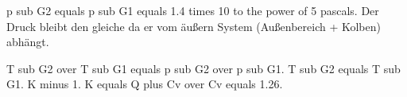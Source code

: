 p sub G2 equals p sub G1 equals 1.4 times 10 to the power of 5 pascals. Der Druck bleibt den gleiche da er vom äußern System (Außenbereich + Kolben) abhängt.

T sub G2 over T sub G1 equals p sub G2 over p sub G1. T sub G2 equals T sub G1. K minus 1. K equals Q plus Cv over Cv equals 1.26.